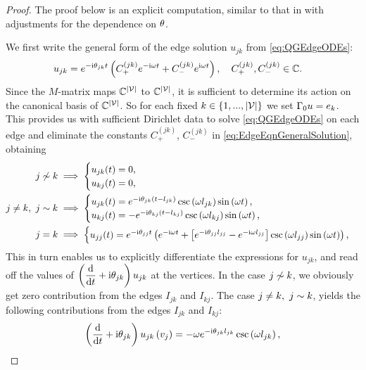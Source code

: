 \begin{proof}
	The proof below is an explicit computation, similar to that in \cite{ershova2014isospectrality} with adjustments for the dependence on $\theta$.
	
	We first write the general form of the edge solution $u_{jk}$ from \eqref{eq:QGEdgeODEs}:
	\begin{align} \label{eq:EdgeEqnGeneralSolution}
		u_{jk} &= e^{-\mathrm{i}\theta_{jk}t}\left(  C_{+}^{(jk)}e^{-\mathrm{i}\omega t} + C_{-}^{(jk)}e^{\mathrm{i}\omega t}  \right),
		\quad C_{+}^{(jk)}, C_{-}^{(jk)}\in\mathbb{C}.
	\end{align}
	Since the $M$-matrix maps $\mathbb{C}^{\left\lvert \mathcal{V} \right\rvert}$ to $\mathbb{C}^{\left\lvert \mathcal{V} \right\rvert}$, it is sufficient to determine its action on the canonical basis of $\mathbb{C}^{\left\lvert \mathcal{V} \right\rvert}$.
	So for each fixed $k\in\left\{ 1,...,\left\lvert \mathcal{V} \right\rvert \right\}$ we set $\Gamma_0 u = e_k$.
	This provides us with sufficient Dirichlet data to solve \eqref{eq:QGEdgeODEs} on each edge and eliminate the constants $C_{+}^{(jk)}$, $C_{-}^{(jk)}$ in \eqref{eq:EdgeEqnGeneralSolution}, obtaining
	\begin{align*}
		j\not\sim k &\implies
		\begin{cases}
			u_{jk}(t) = 0, \\
			u_{kj}(t) = 0,
		\end{cases} \\
		j\neq k, \ j\sim k &\implies
		\begin{cases}
			u_{jk}(t) = e^{-\mathrm{i}\theta_{jk}\left( t-l_{jk} \right)}\csc\left( \omega l_{jk} \right)\sin\left( \omega t \right), \\
			u_{kj}(t) = -e^{-\mathrm{i}\theta_{kj}\left( t-l_{kj} \right)}\csc\left( \omega l_{kj} \right)\sin\left( \omega t \right),
		\end{cases} \\
		j = k &\implies 
		\begin{cases}
			u_{jj}(t) = e^{-\mathrm{i}\theta_{jj}t} \left(  e^{-\mathrm{i}\omega t} + \left[ e^{-\mathrm{i}\theta_{jj}l_{jj}}-e^{-\mathrm{i}\omega l_{jj}} \right]\csc\left( \omega l_{jj} \right)\sin\left( \omega t \right)   \right),
		\end{cases}
	\end{align*}
	This in turn enables us to explicitly differentiate the expressions for $u_{jk}$, and read off the values of $\left( \dfrac{\mathrm{d}}{\mathrm{d}t}+\mathrm{i}\theta_{jk} \right)u_{jk}$ at the vertices.
	In the case $j\not\sim k$, we obviously get zero contribution from the edges $I_{jk}$ and $I_{kj}$.
	The case $j\neq k, \ j\sim k$, yields the following contributions from the edges $I_{jk}$ and $I_{kj}$:
	\begin{align*}
		\bracs{\diff{}{t}+\rmi\qm_{jk}}u_{jk}\bracs{v_j} = -\omega e^{-\rmi\qm_{jk}l_{jk}}\csc\bracs{\omega l_{jk}}, 

\end{align*}
\end{proof}
